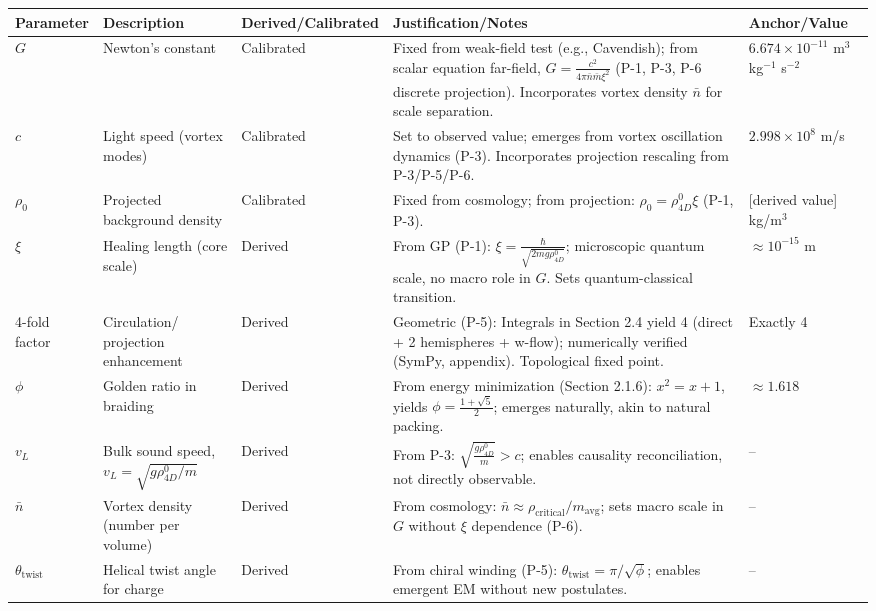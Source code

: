 \begin{table}[H]
\centering
\small
\begin{tabularx}{\linewidth}{|p{1.5cm}|p{2cm}|l|X|p{3cm}|}
\hline
Parameter & Description & Derived/Calibrated & Justification/Notes & Anchor/Value \\
\hline
$G$ & Newton's constant & Calibrated & Fixed from weak-field test (e.g., Cavendish); from scalar equation far-field, $G = \frac{c^2}{4\pi \bar{n} \bar{m} \xi^2}$ (P-1, P-3, P-6 discrete projection). Incorporates vortex density $\bar{n}$ for scale separation. & $6.674 \times 10^{-11}$ m$^3$ kg$^{-1}$ s$^{-2}$ \\
\hline
$c$ & Light speed (vortex modes) & Calibrated & Set to observed value; emerges from vortex oscillation dynamics (P-3). Incorporates projection rescaling from P-3/P-5/P-6. & $2.998 \times 10^8$ m/s \\
\hline
$\rho_0$ & Projected background density & Calibrated & Fixed from cosmology; from projection: $\rho_0 = \rho_{4D}^0 \xi$ (P-1, P-3). & [derived value] kg/m$^3$ \\
\hline
$\xi$ & Healing length (core scale) & Derived & From GP (P-1): $\xi = \frac{\hbar}{\sqrt{2 m g \rho_{4D}^0}}$; microscopic quantum scale, no macro role in $G$. Sets quantum-classical transition. & $\approx 10^{-15}$ m \\
\hline
4-fold factor & Circulation/ projection enhancement & Derived & Geometric (P-5): Integrals in Section 2.4 yield 4 (direct + 2 hemispheres + w-flow); numerically verified (SymPy, appendix). Topological fixed point. & Exactly 4 \\
\hline
$\phi$ & Golden ratio in braiding & Derived & From energy minimization (Section 2.1.6): $x^2 = x + 1$, yields $\phi = \frac{1 + \sqrt{5}}{2}$; emerges naturally, akin to natural packing. & $\approx 1.618$ \\
\hline
$v_L$ & Bulk sound speed, $v_L = \sqrt{g \rho_{4D}^0 / m}$ & Derived & From P-3: $\sqrt{\frac{g \rho_{4D}^0}{m}} > c$; enables causality reconciliation, not directly observable. & -- \\
\hline
$\bar{n}$ & Vortex density (number per volume) & Derived & From cosmology: $\bar{n} \approx \rho_{\text{critical}} / m_{\text{avg}}$; sets macro scale in $G$ without $\xi$ dependence (P-6). & -- \\
\hline
$\theta_{\text{twist}}$ & Helical twist angle for charge & Derived & From chiral winding (P-5): $\theta_{\text{twist}} = \pi / \sqrt{\phi}$; enables emergent EM without new postulates. & -- \\

\end{tabularx}
\end{table}
